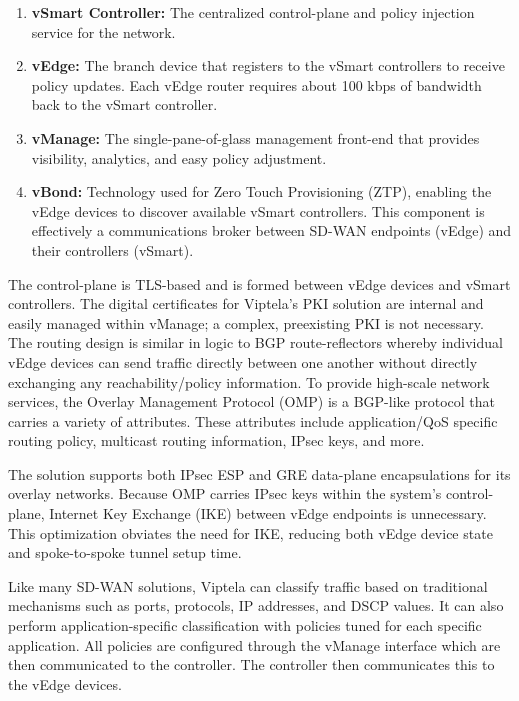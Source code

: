 \begin{enumerate}
  \item \textbf{vSmart Controller:} The centralized control-plane and policy
  injection service for the network.
  \item \textbf{vEdge:} The branch device that registers to the vSmart
  controllers to receive policy updates. Each vEdge router requires about 100
  kbps of bandwidth back to the vSmart controller.
  \item \textbf{vManage:} The single-pane-of-glass management front-end that
  provides visibility, analytics, and easy policy adjustment.
  \item \textbf{vBond:} Technology used for Zero Touch Provisioning (ZTP),
  enabling the vEdge devices to discover available vSmart controllers. This
  component is effectively a communications broker between SD-WAN endpoints
  (vEdge) and their controllers (vSmart).
\end{enumerate}

The control-plane is TLS-based and is formed between vEdge devices and vSmart
controllers. The digital certificates for Viptela’s PKI solution are internal
and easily managed within vManage; a complex, preexisting PKI is not
necessary. The routing design is similar in logic to BGP route-reflectors
whereby individual vEdge devices can send traffic directly between one another
without directly exchanging any reachability/policy information. To provide
high-scale network services, the Overlay Management Protocol (OMP) is a
BGP-like protocol that carries a variety of attributes. These attributes
include application/QoS specific routing policy, multicast routing
information, IPsec keys, and more.

The solution supports both IPsec ESP and GRE data-plane encapsulations for its
overlay networks. Because OMP carries IPsec keys within the system’s
control-plane, Internet Key Exchange (IKE) between vEdge endpoints is
unnecessary. This optimization obviates the need for IKE, reducing both vEdge
device state and spoke-to-spoke tunnel setup time.

Like many SD-WAN solutions, Viptela can classify traffic based on traditional
mechanisms such as ports, protocols, IP addresses, and DSCP values. It can
also perform application-specific classification with policies tuned for each
specific application. All policies are configured through the vManage
interface which are then communicated to the controller. The controller then
communicates this to the vEdge devices.

